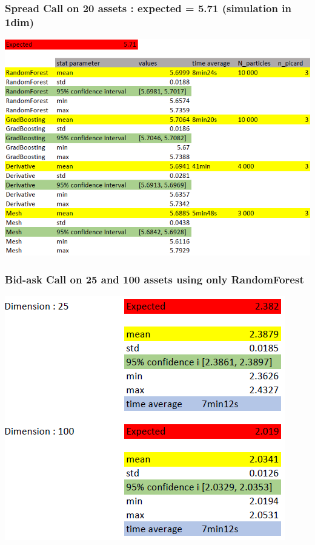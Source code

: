 \documentclass[10pt]{beamer}
\begin{document}
 \begin{frame}
 	\frametitle{Spread Call on 20 assets : expected = 5.71 (simulation in 1dim)}
 	\centering
 	\includegraphics[scale=0.4]{bid_ask_call_combination_20_dim.png}
 \end{frame}

\begin{frame}
	\frametitle{Bid-ask Call on 25 and 100 assets using only RandomForest}
	\centering
	\includegraphics[scale=0.4]{25and100.png}
\end{frame}
\end{document}
